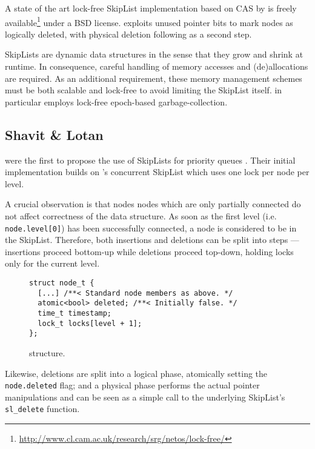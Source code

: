 \documentclass[a4paper,10pt]{article}
\begin{document}
A state of the art lock-free SkipList implementation based on \ac{CAS}
by \citeauthor{fraser2004practical} \cite{fraser2004practical} is freely available\footnote{
\url{http://www.cl.cam.ac.uk/research/srg/netos/lock-free/}} under a BSD license.
\citeauthor{fraser2004practical} exploits unused pointer bits to mark nodes as logically
deleted, with physical deletion following as a second step.

SkipLists are dynamic data structures in the sense that they grow and shrink
at runtime. In consequence, careful handling of memory accesses and (de)allocations
are required. As an additional requirement, these memory management schemes must
be both scalable and lock-free to avoid limiting the SkipList itself.
\citeauthor{fraser2004practical} in particular employs lock-free epoch-based garbage-collection.

\subsection{Shavit \& Lotan} \label{sec:shavit}

\citeauthor{shavit2000skiplist} were the first to propose the use of SkipLists
for priority queues \cite{linden2013skiplist}. Their initial implementation
\cite{shavit2000skiplist} builds on \citeauthor{pugh1998concurrent}'s concurrent
SkipList \cite{pugh1998concurrent} which uses one lock per node per level.


A crucial observation is that nodes nodes which are only partially connected
do not affect correctness of the data structure. As soon as the first level (i.e. \lstinline|node.level[0]|)
has been successfully connected, a node is considered to be in the SkipList.
Therefore, both insertions and deletions can be split into steps --- insertions
proceed bottom-up while deletions proceed top-down, holding locks only for the current level.

\begin{figure}[h]
\begin{lstlisting}
struct node_t {
  [...] /**< Standard node members as above. */
  atomic<bool> deleted; /**< Initially false. */
  time_t timestamp;
  lock_t locks[level + 1];
};
\end{lstlisting}
\caption{\citeauthor{shavit2000skiplist} structure.}
\label{fig:shavitsl}
\end{figure}

Likewise, deletions are split into a logical phase, atomically setting the \lstinline|node.deleted|
flag; and a physical phase performs the actual pointer manipulations and can be seen as a simple
call to the underlying SkipList's \lstinline|sl_delete| function.
\end{document}
